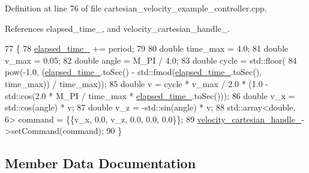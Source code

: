 Definition at line 76 of file cartesian\+\_\+velocity\+\_\+example\+\_\+controller.\+cpp.



References elapsed\+\_\+time\+\_\+, and velocity\+\_\+cartesian\+\_\+handle\+\_\+.


\begin{DoxyCode}
77                                                                            \{
78   \hyperlink{classfranka__example__controllers_1_1CartesianVelocityExampleController_aea64d1bd4901f1b2a3f953f53c9d973c}{elapsed\_time\_} += period;
79 
80   \textcolor{keywordtype}{double} time\_max = 4.0;
81   \textcolor{keywordtype}{double} v\_max = 0.05;
82   \textcolor{keywordtype}{double} angle = M\_PI / 4.0;
83   \textcolor{keywordtype}{double} cycle = std::floor(
84       pow(-1.0, (\hyperlink{classfranka__example__controllers_1_1CartesianVelocityExampleController_aea64d1bd4901f1b2a3f953f53c9d973c}{elapsed\_time\_}.toSec() - std::fmod(\hyperlink{classfranka__example__controllers_1_1CartesianVelocityExampleController_aea64d1bd4901f1b2a3f953f53c9d973c}{elapsed\_time\_}.toSec(), 
      time\_max)) / time\_max));
85   \textcolor{keywordtype}{double} v = cycle * v\_max / 2.0 * (1.0 - std::cos(2.0 * M\_PI / time\_max * 
      \hyperlink{classfranka__example__controllers_1_1CartesianVelocityExampleController_aea64d1bd4901f1b2a3f953f53c9d973c}{elapsed\_time\_}.toSec()));
86   \textcolor{keywordtype}{double} v\_x = std::cos(angle) * v;
87   \textcolor{keywordtype}{double} v\_z = -std::sin(angle) * v;
88   std::array<double, 6> command = \{\{v\_x, 0.0, v\_z, 0.0, 0.0, 0.0\}\};
89   \hyperlink{classfranka__example__controllers_1_1CartesianVelocityExampleController_a70d748ed0786497d2ca847e011c237c9}{velocity\_cartesian\_handle\_}->setCommand(command);
90 \}
\end{DoxyCode}


\subsection{Member Data Documentation}
\mbox{\label{classfranka__example__controllers_1_1CartesianVelocityExampleController_aea64d1bd4901f1b2a3f953f53c9d973c}} 
